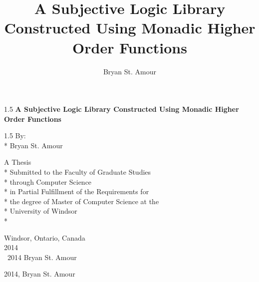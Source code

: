\documentclass[oneside]{book}
\title{A Subjective Logic Library Constructed Using Monadic Higher Order Functions}
\author{Bryan St. Amour}
\newcommand{\uwinonehalfspacelen}{1.5}
\newenvironment{uwinonehalfspaceenv}%
{\begin{spacing}{\uwinonehalfspacelen}}%
  {\end{spacing}}
\begin{document}



\clearpage


\thispagestyle{empty}
\begin{center}
  \vspace*{1in}

  \begin{uwinonehalfspaceenv}
    \Large\textbf{A Subjective Logic Library Constructed Using Monadic Higher Order Functions}
  \end{uwinonehalfspaceenv}

  \vspace{\fill} %
  \begin{uwinonehalfspaceenv}
    By:\\*
    Bryan St. Amour
  \end{uwinonehalfspaceenv}
  \vspace{\fill}

  \normalsize
  A Thesis \\*
  Submitted to the Faculty of Graduate Studies \\*
  through Computer Science \\*
  in Partial Fulfillment of the Requirements for \\*
  the degree of Master of Computer Science at the \\*
  University of Windsor \\*

  \vspace{1in}
  Windsor, Ontario, Canada \\
  \vspace{0.5cm}
  2014 \\
  \vspace{0.5cm}
  \textcopyright \  2014 Bryan St. Amour
\end{center}


\clearpage
\thispagestyle{empty}

\vspace*{\fill}

\noindent \textcopyright{} 2014, Bryan St. Amour

\vspace{2ex}
\end{document}
